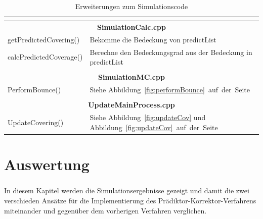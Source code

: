 \documentclass{listhesis}
\begin{document}
\begin{table}
\begin{center}
\begin{tabular}{|l|l|}
\multicolumn{2}{c}{}\\%

\hline
\multicolumn{2}{|c|}{\rule{0pt}{\vsep}\textbf{SimulationCalc.cpp}}\\
\hline
\rule{0pt}{\vsep}getPredictedCovering()&Bekomme die Bedeckung von predictList\\
\rule{0pt}{\vsep}calcPredictedCoverage()&Berechne den Bedeckungsgrad aus der Bedeckung in predictList\\
\hline

\multicolumn{2}{c}{}\\%

\hline
\multicolumn{2}{|c|}{\rule{0pt}{\vsep}\textbf{SimulationMC.cpp}}\\
\hline
\rule{0pt}{\vsep} PerformBounce()&Siehe Abbildung~\ref{fig:performBounce}~auf~der~Seite~\pageref{fig:performBounce}\\
\hline

\multicolumn{2}{c}{}\\%

\hline
\multicolumn{2}{|c|}{\rule{0pt}{\vsep}\textbf{UpdateMainProcess.cpp}}\\
\hline
\rule{0pt}{\vsep} UpdateCovering()&Siehe Abbildung~\ref{fig:updateCov} und Abbildung~\ref{fig:updateCov}~auf~der~Seite~\pageref{fig:updateCov}\\
\hline

\end{tabular}
\end{center}
\caption{Erweiterungen zum Simulationscode}
\label{tab:all}
\end{table}

\chapter{Auswertung} \label{chap:auswertung}
\paragraph{}
In diesem Kapitel werden die Simulationsergebnisse gezeigt und damit die zwei verschieden Ansätze für die Implementierung des Prädiktor-Korrektor-Verfahrens miteinander und gegenüber dem vorherigen Verfahren verglichen.
\end{document}

